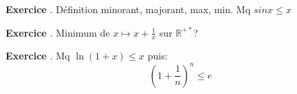 \documentclass[10pt,a4paper]{article}
\newcounter{question}
\newcounter{exo}
\newenvironment{exo}{\vspace{0.5cm}\setcounter{question}{0}\addtocounter{exo}{1} \noindent \textbf{Exercice \theexo}. \normalsize }{\par}
\begin{document}
	\begin{exo}
		Définition minorant, majorant, max, min. Mq $sin x \leq x$ 
	\end{exo}

	\begin{exo}
		Minimum de $x \longmapsto x + \frac{1}{x}$ sur $\mathbb{R}^{+*}$?
	\end{exo}

	\begin{exo}
		Mq $\ln(1+x) \leq x$ puis: $$(1 + \frac{1}{n})^n \leq e$$
	\end{exo}
	
\end{document}
